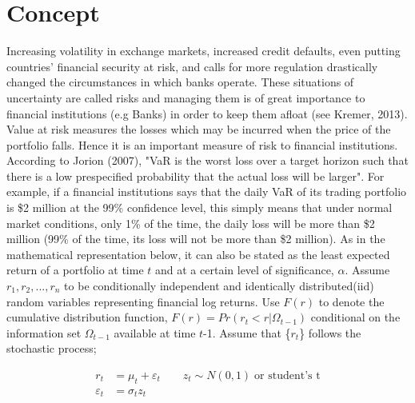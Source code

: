 \documentclass[a4paper,11pt,oneside]{book}
\begin{document}

\section{Concept}
Increasing volatility in exchange markets, increased credit defaults, even putting countries' financial security at risk, and calls for more regulation drastically changed the circumstances in which banks operate. These situations of uncertainty are called risks and managing them is of great importance to financial institutions (e.g Banks) in order to keep them afloat (see Kremer, 2013). Value at risk measures the losses which may be incurred when the price of the portfolio falls. Hence it is an important measure of risk to financial institutions.
\newline\newline
According to Jorion (2007), "VaR is the worst loss over a target horizon such that there is a low prespecified probability that the actual loss will be larger". For example, if a financial institutions says that
the daily VaR of its trading portfolio is \$2 million at the 99\%
confidence level, this simply means that under normal market conditions,
only 1\% of the time, the daily loss will be more than \$2 million (99\% of the time, its loss will not be more than \$2 million). As in the mathematical representation below, it can also be stated as the least expected return of a portfolio at time $t$ and at a certain level of significance, $\alpha$.
\newline\newline
Assume $r_1, r_2, ..., r_n$ to be conditionally independent and identically distributed(iid) random variables representing financial log returns. Use $F(r)$ to denote the cumulative distribution function,
$F(r) = Pr(r_{t} < r|\Omega_{t-1})$ conditional on the information set $\Omega_{t-1}$ available at time $t$-1. Assume that \{$r_t$\} follows the stochastic process; 

\begin{equation}
\begin{aligned}
r_t &= \mu_t + \varepsilon_t   \quad \quad z_t \sim N(0,1) \; \text{or student's t}
\\ 
\varepsilon_t &= \sigma_t  z_t
\label{1}
\end{aligned}
\end{equation}
\end{document}
